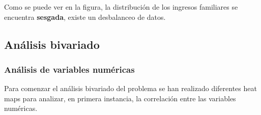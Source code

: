 \documentclass[a4paper]{article}
\begin{document}
           
           
           
           
           
           
             Como se puede ver en la figura, la distribución de los ingresos familiares se encuentra \textbf{sesgada}, existe un desbalanceo de datos.

    
    \newpage
    
    \subsection{Análisis bivariado}
        \subsubsection{Análisis de variables numéricas}
 
        Para comenzar el análisis bivariado del problema se han realizado diferentes heat maps para analizar, en primera instancia, la correlación entre las variables numéricas.        
       
\end{document}
